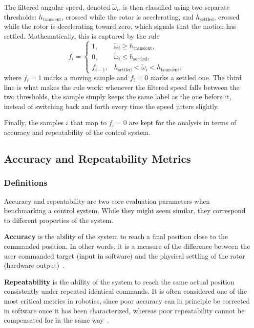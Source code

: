 The filtered angular speed, denoted $\widetilde{\omega}_i$, is then classified using two separate thresholds: $h_{\mathrm{transient}}$, crossed while the rotor is accelerating, and $h_{\mathrm{settled}}$, crossed while the rotor is decelerating toward zero, which signals that the motion has settled. Mathematically, this is captured by the rule
\begin{equation*}
    f_i = \begin{cases}
        1, & \widetilde{\omega}_i \geq h_{\mathrm{transient}}, \\
        0, & \widetilde{\omega}_i \leq h_{\mathrm{settled}}, \\
        f_{i-1}, & h_{\mathrm{settled}} < \widetilde{\omega}_i < h_{\mathrm{transient}},
    \end{cases}
\end{equation*}
where $f_i = 1$ marks a moving sample and $f_i = 0$ marks a settled one. The third line is what makes the rule work: whenever the filtered speed falls between the two thresholds, the sample simply keeps the same label as the one before it, instead of switching back and forth every time the speed jitters slightly.

Finally, the samples $i$ that map to $f_i = 0$ are kept for the analysis in terms of accuracy and repeatability of the control system.

\subsection{Accuracy and Repeatability Metrics}
\label{subsec:accuracy-repeatability-metrics}

\subsubsection*{Definitions}
Accuracy and repeatability are two core evaluation parameters when benchmarking a control system. While they might seem similar, they correspond to different properties of the system.

\textbf{Accuracy} is the ability of the system to reach a final position close to the commanded position. In other words, it is a measure of the difference between the user commanded target (input in software) and the physical settling of the rotor (hardware output)~\cite{motionsolutions_accuracy_misconceptions}.

\textbf{Repeatability} is the ability of the system to reach the same actual position consistently under repeated identical commands. It is often considered one of the most critical metrics in robotics, since poor accuracy can in principle be corrected in software once it has been characterized, whereas poor repeatability cannot be compensated for in the same way~\cite{motionsolutions_accuracy_misconceptions}.

